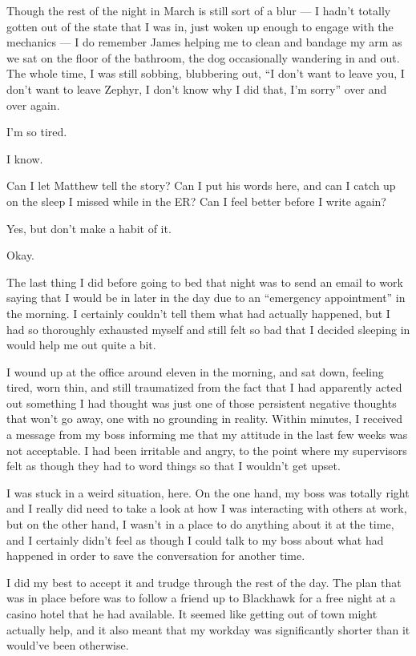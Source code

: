 \begin{paracol}{2}
\begin{leftcolumn}
Though the rest of the night in March is still sort of a blur --- I hadn't totally gotten out of the state that I was in, just woken up enough to engage with the mechanics --- I do remember James helping me to clean and bandage my arm as we sat on the floor of the bathroom, the dog occasionally wandering in and out. The whole time, I was still sobbing, blubbering out, ``I don't want to leave you, I don't want to leave Zephyr, I don't know why I did that, I'm sorry'' over and over again.
\newpage

\noindent I'm so tired.

\begin{ally}
I know.
\end{ally}
Can I let Matthew tell the story? Can I put his words here, and can I catch up on the sleep I missed while in the ER? Can I feel better before I write again?

\begin{ally}
Yes, but don't make a habit of it.
\end{ally}
Okay.

The last thing I did before going to bed that night was to send an email to work saying that I would be in later in the day due to an ``emergency appointment'' in the morning. I certainly couldn't tell them what had actually happened, but I had so thoroughly exhausted myself and still felt so bad that I decided sleeping in would help me out quite a bit.

I wound up at the office around eleven in the morning, and sat down, feeling tired, worn thin, and still traumatized from the fact that I had apparently acted out something I had thought was just one of those persistent negative thoughts that won't go away, one with no grounding in reality. Within minutes, I received a message from my boss informing me that my attitude in the last few weeks was not acceptable. I had been irritable and angry, to the point where my supervisors felt as though they had to word things so that I wouldn't get upset.

I was stuck in a weird situation, here. On the one hand, my boss was totally right and I really did need to take a look at how I was interacting with others at work, but on the other hand, I wasn't in a place to do anything about it at the time, and I certainly didn't feel as though I could talk to my boss about what had happened in order to save the conversation for another time.

I did my best to accept it and trudge through the rest of the day. The plan that was in place before was to follow a friend up to Blackhawk for a free night at a casino hotel that he had available. It seemed like getting out of town might actually help, and it also meant that my workday was significantly shorter than it would've been otherwise.


\end{leftcolumn}
\end{paracol}

